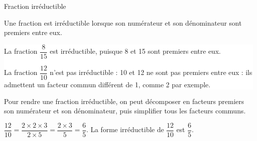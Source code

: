 \begin{DefTB}{Fraction irréductible} 

\hspace{1mm}
\begin{minipage}{0.98\linewidth}
Une fraction est irréductible lorsque son numérateur et son dénominateur sont premiers entre eux. 
\end{minipage}


  \vspace{3mm}
\colorbox{white}{
\begin{minipage}{0.98\linewidth}

 La fraction $\dfrac{8}{15}$ est irréductible, puisque 8 et 15 sont premiers entre eux.
 
La fraction $\dfrac{12}{10}$ n'est pas irréductible : 10 et 12 ne sont pas premiers entre eux : ils admettent un facteur commun
différent de 1, comme 2 par exemple.

 \end{minipage}
}



\begin{BoxMt}
Pour rendre une fraction irréductible, on peut décomposer en facteurs premiers son numérateur
et son dénominateur, puis simplifier tous les facteurs communs.

 $\dfrac{12}{10}= \dfrac{2 \times 2 \times 3}{2 \times 5}= \dfrac{2 \times 3}{5}= \dfrac{6}{5}$. La forme irréductible de $\dfrac{12}{10}$ est $\dfrac{6}{5}$.
\end{BoxMt}

\end{DefTB}













